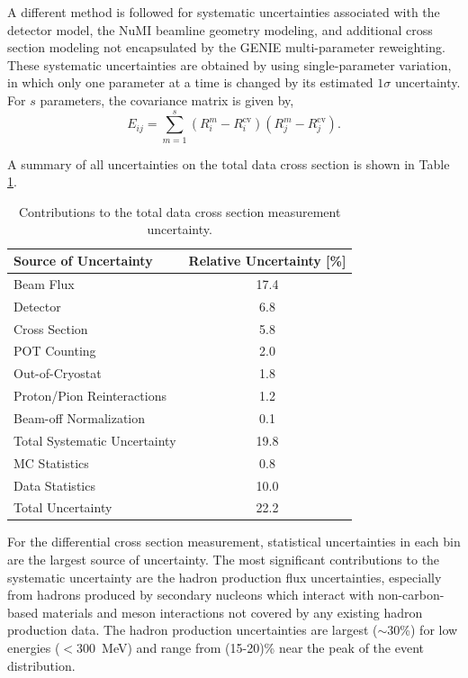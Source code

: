 \documentclass[%
twocolumn,
superscriptaddress,
showpacs,preprintnumbers,
amsmath,amssymb,
aps,
prl,
longbibliography
]{revtex4-1}
\begin{document}
A different method is followed for systematic uncertainties associated with the detector model, the NuMI beamline geometry modeling, and additional cross section modeling not encapsulated by the GENIE multi-parameter reweighting. These systematic uncertainties are obtained by using single-parameter variation, in which only one parameter at a time is changed by its estimated $1\sigma$ uncertainty. For $s$ parameters, the covariance matrix is given by,
\begin{equation}
\label{eq:unisim}
E_{ij} = \sum_{m = 1}^{s} (R_i^m - R_i^\text{cv})(R_j^m - R_j^\text{cv}).
\end{equation}

\noindent A summary of all uncertainties on the total data cross section is shown in Table \ref{tab:total_xsec_uncertainties}. 

\begin{table}[h]
\caption{\label{tab:total_xsec_uncertainties}Contributions to the total data cross section measurement uncertainty.}
\begin{ruledtabular}
\begin{tabular}{lc}
Source of Uncertainty        &  Relative Uncertainty [\%] \\ \hline
\colrule
Beam Flux                &  17.4 \\
Detector                 &  6.8  \\
Cross Section            &  5.8  \\
POT Counting             &  2.0  \\
Out-of-Cryostat          &  1.8  \\
Proton/Pion Reinteractions    &  1.2  \\
Beam-off Normalization   &  0.1  \\
\colrule
Total Systematic Uncertainty         &  19.8 \\
\colrule
MC Statistics            &  0.8  \\
Data Statistics          &  10.0 \\
\colrule
Total Uncertainty        &  22.2 \\ 
\end{tabular}
\end{ruledtabular}
\end{table}

For the differential cross section measurement, statistical uncertainties in each bin are the largest source of uncertainty. The most significant contributions to the systematic uncertainty are the hadron production flux uncertainties, especially from hadrons produced by secondary nucleons which interact with non-carbon-based materials and meson interactions not covered by any existing hadron production data. The hadron production uncertainties are largest ($\sim$30\%) for low energies ($<$300~MeV) and range from (15-20)\% near the peak of the event distribution. 
\end{document}
